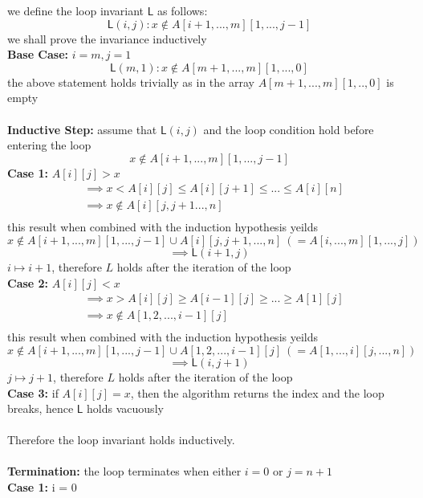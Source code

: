 \documentclass{article}
\begin{document}
we define the loop invariant $\mathsf{L}$ as follows:\\
$$\mathsf{L}(i, j): x \notin A[i+1,...,m][1,...,j-1]$$
we shall prove the invariance inductively\\
\textbf{Base Case:} $i = m, j = 1$\\
$$\mathsf{L}(m, 1): x \notin A[m+1,...,m][1,...,0]$$
the above statement holds trivially as in the array $A[m+1,...,m][1,..,0]$ is empty\\\\
\textbf{Inductive Step:} assume that $\mathsf{L}(i, j)$ and the loop condition hold before entering the loop\\
$$x \notin A[i+1,...,m][1,...,j-1]$$
\textbf{Case 1:} $A[i][j] > x$\\
    \begin{align*}
        &\implies x < A[i][j] \leq A[i][j+1] \leq ... \leq A[i][n]\\
        &\implies x \notin A[i][j,j+1...,n]\\
    \end{align*}
    this result when combined with the induction hypothesis yeilds
    $$x \notin A[i+1,...,m][1,...,j-1] \cup A[i][j,j+1,...,n] ~ (= A[i,...,m][1,...,j])$$
    $$\implies \mathsf{L}(i+1, j)$$
    $i \mapsto i+1$, therefore $L$ holds after the iteration of the loop\\
\textbf{Case 2:} $A[i][j] < x$\\
    \begin{align*}
        &\implies x > A[i][j] \geq A[i-1][j] \geq ... \geq A[1][j]\\
        &\implies x \notin A[1,2,...,i-1][j]\\
    \end{align*}
    this result when combined with the induction hypothesis yeilds
    $$x \notin A[i+1,...,m][1,...,j-1] \cup A[1,2,...,i-1][j] ~ (= A[1,...,i][j,...,n])$$
    $$\implies \mathsf{L}(i, j+1)$$
    $j \mapsto j+1$, therefore $L$ holds after the iteration of the loop\\
\textbf{Case 3:} if $A[i][j] = x$, then the algorithm returns the index and the loop breaks, hence $\mathsf{L}$ holds vacuously\\
\\
Therefore the loop invariant holds inductively.\\
\\
\textbf{Termination:} the loop terminates when either $i = 0$ or $j = n+1$\\
\textbf{Case 1:} i = 0\\
\end{document}
